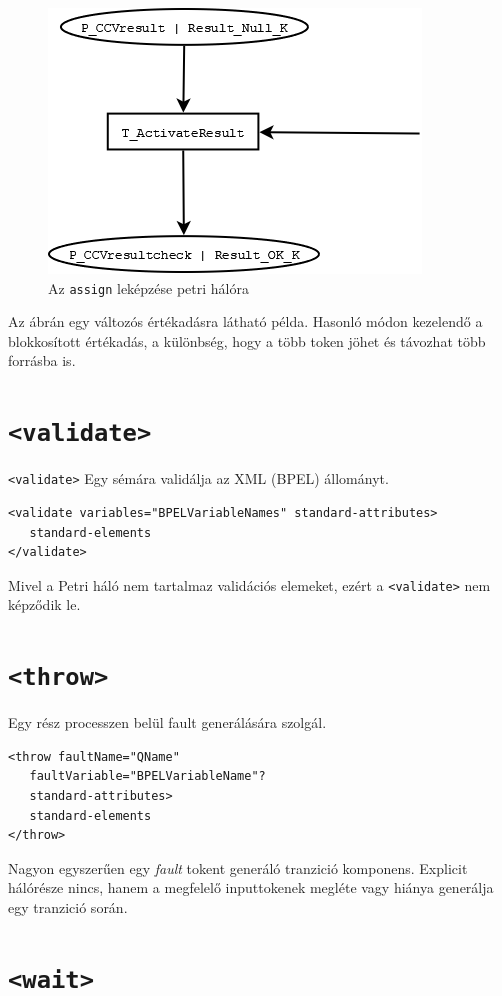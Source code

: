 \begin{figure}[h!]
\centering
\includegraphics[scale=0.6]{images/assignnet.png}
\caption{Az \texttt{assign} leképzése petri hálóra}
\label{fig:assignnet}
\end{figure}
Az ábrán egy változós értékadásra látható példa. Hasonló módon kezelendő a  blokkosított értékadás, a különbség, hogy a több token jöhet és távozhat több forrásba is.

\section{\texttt{<validate>}}

\texttt{<validate>} Egy sémára validálja az XML (BPEL) állományt. 
\begin{verbatim}
<validate variables="BPELVariableNames" standard-attributes>
   standard-elements
</validate>
\end{verbatim}
Mivel a Petri háló nem tartalmaz validációs elemeket, ezért a \texttt{<validate>} nem képződik le. 

\section{\texttt{<throw>}}

Egy rész processzen belül fault generálására szolgál. 
\begin{verbatim}
<throw faultName="QName"
   faultVariable="BPELVariableName"?
   standard-attributes>
   standard-elements
</throw>
\end{verbatim}
Nagyon egyszerűen egy \textit{fault} tokent generáló tranzició komponens. Explicit hálórésze nincs, hanem a megfelelő inputtokenek megléte vagy hiánya generálja egy tranzició során. 

\section{\texttt{<wait>}}

